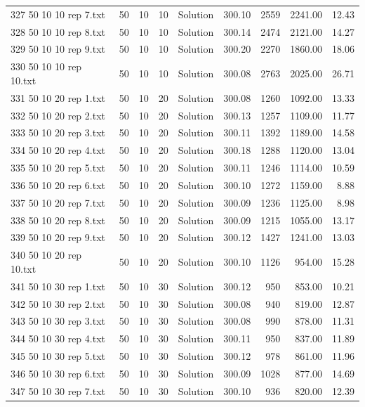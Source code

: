 \begin{longtable}{lrrllrrrr}
327 50 10 10 rep 7.txt & 50 & 10 & 10 & Solution & 300.10 & 2559 & 2241.00 & 12.43\\
328 50 10 10 rep 8.txt & 50 & 10 & 10 & Solution & 300.14 & 2474 & 2121.00 & 14.27\\
329 50 10 10 rep 9.txt & 50 & 10 & 10 & Solution & 300.20 & 2270 & 1860.00 & 18.06\\
330 50 10 10 rep 10.txt & 50 & 10 & 10 & Solution & 300.08 & 2763 & 2025.00 & 26.71\\
331 50 10 20 rep 1.txt & 50 & 10 & 20 & Solution & 300.08 & 1260 & 1092.00 & 13.33\\
332 50 10 20 rep 2.txt & 50 & 10 & 20 & Solution & 300.13 & 1257 & 1109.00 & 11.77\\
333 50 10 20 rep 3.txt & 50 & 10 & 20 & Solution & 300.11 & 1392 & 1189.00 & 14.58\\
334 50 10 20 rep 4.txt & 50 & 10 & 20 & Solution & 300.18 & 1288 & 1120.00 & 13.04\\
335 50 10 20 rep 5.txt & 50 & 10 & 20 & Solution & 300.11 & 1246 & 1114.00 & 10.59\\
336 50 10 20 rep 6.txt & 50 & 10 & 20 & Solution & 300.10 & 1272 & 1159.00 &  8.88\\
337 50 10 20 rep 7.txt & 50 & 10 & 20 & Solution & 300.09 & 1236 & 1125.00 &  8.98\\
338 50 10 20 rep 8.txt & 50 & 10 & 20 & Solution & 300.09 & 1215 & 1055.00 & 13.17\\
339 50 10 20 rep 9.txt & 50 & 10 & 20 & Solution & 300.12 & 1427 & 1241.00 & 13.03\\
340 50 10 20 rep 10.txt & 50 & 10 & 20 & Solution & 300.10 & 1126 & 954.00 & 15.28\\
341 50 10 30 rep 1.txt & 50 & 10 & 30 & Solution & 300.12 & 950 & 853.00 & 10.21\\
342 50 10 30 rep 2.txt & 50 & 10 & 30 & Solution & 300.08 & 940 & 819.00 & 12.87\\
343 50 10 30 rep 3.txt & 50 & 10 & 30 & Solution & 300.08 & 990 & 878.00 & 11.31\\
344 50 10 30 rep 4.txt & 50 & 10 & 30 & Solution & 300.11 & 950 & 837.00 & 11.89\\
345 50 10 30 rep 5.txt & 50 & 10 & 30 & Solution & 300.12 & 978 & 861.00 & 11.96\\
346 50 10 30 rep 6.txt & 50 & 10 & 30 & Solution & 300.09 & 1028 & 877.00 & 14.69\\
347 50 10 30 rep 7.txt & 50 & 10 & 30 & Solution & 300.10 & 936 & 820.00 & 12.39\\

\end{longtable}
